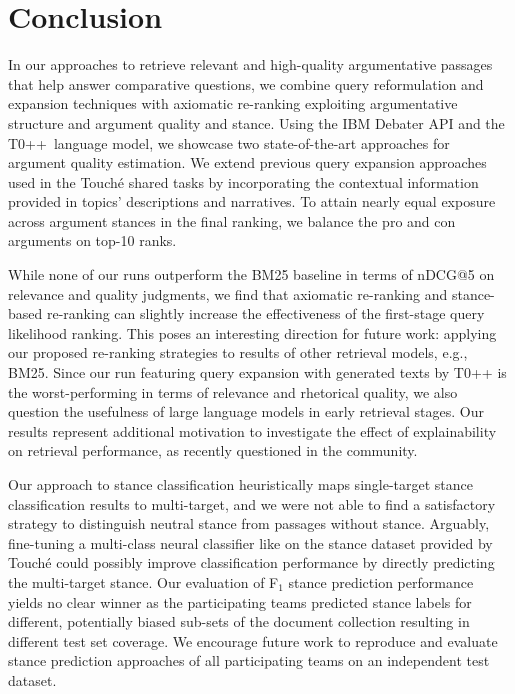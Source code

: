 \section{Conclusion}

In our approaches to retrieve relevant and high-quality argumentative passages that help answer comparative questions, we combine query reformulation and expansion techniques with axiomatic re-ranking exploiting argumentative structure and argument quality and stance.
Using the IBM Debater API and the T0++~language model, we showcase two state-of-the-art approaches for argument quality estimation.
We extend previous query expansion approaches used in the Touch{\'e} shared tasks by incorporating the contextual information provided in topics' descriptions and narratives.
To attain nearly equal exposure across argument stances in the final ranking, we balance the pro and con arguments on top-10 ranks.

While none of our runs outperform the BM25 baseline in terms of nDCG@5 on relevance and quality judgments, we find that axiomatic re-ranking and stance-based re-ranking can slightly increase the effectiveness of the first-stage query likelihood ranking. This poses an interesting direction for future work: applying our proposed re-ranking strategies to results of other retrieval models, e.g., BM25.
Since our run featuring query expansion with generated texts by T0++ is the worst-performing in terms of relevance and rhetorical quality, we also question the usefulness of large language models in early retrieval stages. Our results represent additional motivation to investigate the effect of explainability on retrieval performance, as recently questioned in the community.

Our approach to stance classification heuristically maps single-target stance classification results to multi-target, and we were not able to find a satisfactory strategy to distinguish neutral stance from passages without stance.
Arguably, fine-tuning a multi-class neural classifier like \Bert on the stance dataset provided by Touch{\'e} could possibly improve classification performance by directly predicting the multi-target stance.
Our evaluation of F$_1$ stance prediction performance yields no clear winner as the participating teams predicted stance labels for different, potentially biased sub-sets of the document collection resulting in different test set coverage.
We encourage future work to reproduce and evaluate stance prediction approaches of all participating teams on an independent test dataset.
